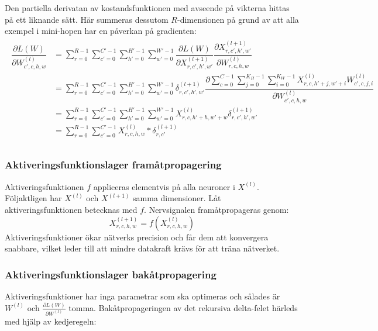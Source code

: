 \documentclass[a4paper,11pt,twoside]{article}
\newcommand*{\pd}[2]{\ensuremath{\dfrac{\partial #1}{\partial #2}}}
\newcommand*{\inpd}[2]{\ensuremath{\frac{\partial #1}{\partial #2}}}
\begin{document}
Den partiella derivatan av kostandsfunktionen med avseende på vikterna hittas på ett liknande sätt. Här summeras dessutom $R$-dimensionen på grund av att alla exempel i mini-hopen har en påverkan på gradienten: \cite{cs231n} \cite{webconv1} \cite{webconv2} \cite{webconv3} 
\begin{align}
\begin{split}
	\pd{L(W)}{W^{(l)}_{c',c,h,w}}
		& = \sum^{R-1}_{r=0} \sum^{C'-1}_{c'=0} \sum^{H'-1}_{h'=0} \sum^{W'-1}_{w'=0} \pd{L(W)}{X^{(l+1)}_{r,c',h',w'}} \pd{X^{(l+1)}_{r,c',h',w'}}{W^{(l)}_{r,c,h,w}} \\
		& = \sum^{R-1}_{r=0} \sum_{c'=0}^{C'-1} \sum^{H'-1}_{h'=0} \sum^{W'-1}_{w'=0} \delta^{(l+1)}_{r,c',h',w'} \pd{\sum\limits^{C-1}_{c=0} \sum\limits^{K_H-1}_{j=0} \sum\limits^{K_W-1}_{i=0} X^{(l)}_{r, c, h'+j, w'+i}W^{(l)}_{c', c, j, i}}{W^{(l)}_{c',c,h,w}} \\
		& = \sum^{R-1}_{r=0} \sum^{C'-1}_{c'=0} \sum^{H'-1}_{h'=0} \sum^{W'-1}_{w'=0} X^{(l)}_{r, c, h'+h, w'+w} \delta^{(l+1)}_{r,c',h',w'} \\
		& = \sum^{R-1}_{r=0} \sum^{C'-1}_{c'=0} X^{(l)}_{r, c, h, w} * \delta^{(l+1)}_{r,c'} \\
\end{split}
\end{align}

\subsubsection{Aktiveringsfunktionslager framåtpropagering}
Aktiveringsfunktionen $f$ appliceras elementvis på alla neuroner i $X^{(l)}$. Följaktligen har $X^{(l)}$ och $X^{(l+1)}$ samma dimensioner. Låt aktiveringsfunktionen betecknas med $f$. Nervsignalen framåtpropageras genom: \cite{convmath}
\begin{equation}
X^{(l+1)}_{r,c,h,w} = f(X^{(l)}_{r,c,h,w})
\end{equation}
Aktiveringsfunktioner ökar nätverks precision och får dem att konvergera snabbare, vilket leder till att mindre datakraft krävs för att träna nätverket. \cite{cs231n}

\subsubsection{Aktiveringsfunktionslager bakåtpropagering}
Aktiveringsfunktioner har inga parametrar som ska optimeras och sålades är $W^{(l)}$ och $\inpd{L(W)}{W^{(l)}}$ tomma. Bakåtpropageringen av det rekursiva delta-felet härleds med hjälp av kedjeregeln: \cite{cs231n} \cite{convmath}
\end{document}
